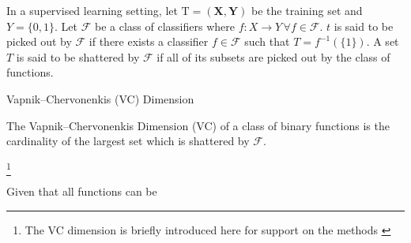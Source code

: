 In a supervised learning setting, let  $\mathrm{T} = (\textbf{X},\textbf{Y})$ be the training set and $Y = \{0,1 \}$. Let $\mathcal {F}$ be a class of classifiers where $f: X \rightarrow Y \, \forall f \in \mathcal {F}$. $t$ is said to be picked out by $\mathcal {F}$ if there exists a classifier $f \in \mathcal {F}$ such that $T = f^{-1}(\{1\})$. 
A set $T$ is said to be shattered by $\mathcal {F}$ if all of its subsets are picked out by the class of functions.

\begin{definition}{Vapnik–Chervonenkis (VC) Dimension}
 	
 	The Vapnik–Chervonenkis Dimension (VC) of a class of binary functions is the cardinality of the largest set which is shattered by $\mathcal {F}$.
\end{definition}\footnote{The VC dimension is briefly introduced here for support on the methods  \cite{cherkassky-learning2007} }
 
Given that all functions can be 
 
